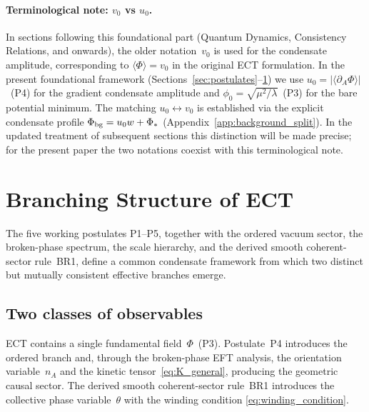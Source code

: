 \documentclass[11pt,a4paper]{article}
\numberwithin{equation}{section}
\begin{document}
\paragraph{Terminological note: $v_0$ vs $u_0$.}
In sections following this foundational part (Quantum Dynamics,
Consistency Relations, and onwards), the older notation~$v_0$
is used for the condensate amplitude, corresponding to
$\langle\Phi\rangle=v_0$ in the original ECT formulation.
In the present foundational framework (Sections~\ref{sec:postulates}--\ref{sec:branching})
we use $u_0=|\langle\partial_A\Phi\rangle|$~(P4) for the
gradient condensate amplitude and $\phi_0=\sqrt{\mu^2/\lambda}$~(P3)
for the bare potential minimum.
The matching $u_0\leftrightarrow v_0$ is established via the
explicit condensate profile $\Phi_{\rm bg}=u_0 w+\Phi_*$
(Appendix~\ref{app:background_split}).
In the updated treatment of subsequent sections this distinction
will be made precise; for the present paper the two notations
coexist with this terminological note.



\section{Branching Structure of ECT}
\label{sec:branching}\label{sec:roadmap}

The five working postulates P1--P5, together with the ordered
vacuum sector, the broken-phase spectrum, the scale hierarchy, and the
derived smooth coherent-sector rule~BR1, define a common condensate
framework from which two distinct but mutually consistent effective
branches emerge.

\subsection{Two classes of observables}
\label{sec:two_observables}

ECT contains a single fundamental field~$\Phi$~(P3).
Postulate~P4 introduces the ordered branch and, through the broken-phase
EFT analysis, the orientation variable~$n_A$ and the kinetic
tensor~\eqref{eq:K_general}, producing the geometric causal sector.
The derived smooth coherent-sector rule~BR1 introduces the collective
phase variable~$\theta$ with the winding condition
\eqref{eq:winding_condition}.
\end{document}
